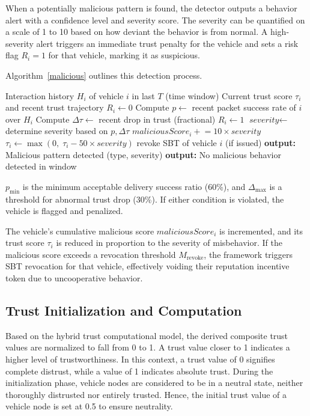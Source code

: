 \cite{cho2010survey}\documentclass[journal,comsoc,twoside]{IEEEtran}
\begin{document}
When a potentially malicious pattern is found, the detector outputs a behavior alert with a confidence level and severity score. The severity can be quantified on a scale of 1 to 10 based on how deviant the behavior is from normal. A high-severity alert triggers an immediate trust penalty for the vehicle and sets a risk flag $R_i=1$ for that vehicle, marking it as suspicious.

Algorithm~\ref{malicious} outlines this detection process.
\begin{algorithm}[!htbp]
\caption{Malicious Behavior Detection for Vehicle $i$}
\label{malicious}
\begin{algorithmic}[1]
\Require Interaction history $H_i$ of vehicle $i$ in last $T$ (time window)
\Require Current trust score $\tau_i$ and recent trust trajectory
\State $R_i \gets 0$ 
\State Compute $p \gets$ recent packet success rate of $i$ over $H_i$
\State Compute $\Delta \tau \gets$ recent drop in trust (fractional)
    \State $R_i \gets 1$ 
    \State $\textit{severity} \gets$ determine severity based on $p,\Delta \tau$ 
    \State $\textit{maliciousScore}_i \mathrel{+}= 10 \times \textit{severity}$ 
    \State $\tau_i \gets \max(0,\; \tau_i - 50 \times \textit{severity})$  
       \State revoke SBT of vehicle $i$ (if issued) \label{alg1:revoke}
    \EndIf
    \State \textbf{output:} Malicious pattern detected (type, severity)
\Else
    \State \textbf{output:} No malicious behavior detected in window
\EndIf
\end{algorithmic}
\end{algorithm}
$p_{\min}$ is the minimum acceptable delivery success ratio (60\%), and $\Delta_{\max}$ is a threshold for abnormal trust drop (30\%). If either condition is violated, the vehicle is flagged and penalized.

The vehicle’s cumulative malicious score $maliciousScore_i$ is incremented, and its trust score $\tau_i$ is reduced in proportion to the severity of misbehavior. If the malicious score exceeds a revocation threshold $M_{\text{revoke}}$, the framework triggers SBT revocation for that vehicle, effectively voiding their reputation incentive token due to uncooperative behavior.

\subsection{Trust Initialization and Computation}
Based on the hybrid trust computational model, the derived composite trust values are normalized to fall from 0 to 1. A trust value closer to 1 indicates a higher level of trustworthiness. In this context, a trust value of 0 signifies complete distrust, while a value of 1 indicates absolute trust. During the initialization phase, vehicle nodes are considered to be in a neutral state, neither thoroughly distrusted nor entirely trusted. Hence, the initial trust value of a vehicle node is set at 0.5 to ensure neutrality.
\end{document}
